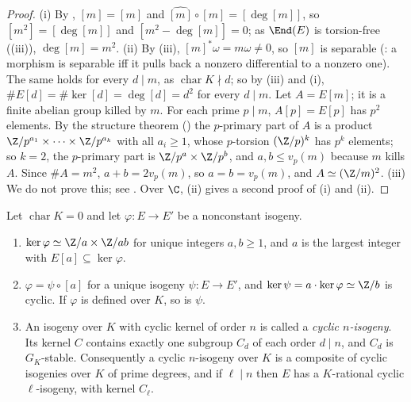 \begin{proof}
(i) By , $\widehat{[m]}=[m]$ and $\widehat{[m]}\circ[m]=[\deg[m]]$, so $[m^2]=[\deg[m]]$ and $[m^2-\deg[m]]=0$; as $\End(E)$ is torsion-free
((iii)), $\deg[m]=m^2$. (ii) By (iii), $[m]^*\omega=m\omega\ne0$, so $[m]$ is separable (:
a morphism is separable iff it pulls back a nonzero differential to a nonzero one). The same holds for every $d\mid m$, as $\operatorname{char}K\nmid d$; so by
(iii) and (i), $\#E[d]=\#\ker[d]=\deg[d]=d^2$ for every $d\mid m$. Let
$A=E[m]$; it is a finite abelian group killed by $m$. For each prime $p\mid m$, $A[p]=E[p]$ has $p^2$ elements. By the structure theorem () the
$p$-primary part of $A$ is a product $\Z/p^{a_1}\times\dots\times\Z/p^{a_k}$ with all $a_i\ge1$, whose $p$-torsion $(\Z/p)^k$ has $p^k$ elements; so $k=2$, the
$p$-primary part is $\Z/p^a\times\Z/p^b$, and $a,b\le v_p(m)$ because $m$ kills $A$. Since $\#A=m^2$, $a+b=2v_p(m)$, so $a=b=v_p(m)$, and
$A\simeq(\Z/m)^2$. (iii) We do not prove this; see \cite[Section III.6]{SilvermanAEC}. Over $\C$, (ii) gives a second proof of (i)
and (ii).
\end{proof}

\begin{proposition}\label{prop:ellcurves:cyclicfactor}
Let $\operatorname{char}K=0$ and let $\varphi\colon E\to E'$ be a nonconstant isogeny.
\begin{enumerate}[label=(\roman*)]
\item $\ker\varphi\simeq\Z/a\times\Z/ab$ for unique integers $a,b\ge1$, and $a$ is the largest integer with $E[a]\subseteq\ker\varphi$.
\item $\varphi=\psi\circ[a]$ for a unique isogeny $\psi\colon E\to E'$, and $\ker\psi=a\cdot\ker\varphi\simeq\Z/b$ is cyclic. If $\varphi$ is defined over $K$, so is $\psi$.
\item An isogeny over $K$ with cyclic kernel of order $n$ is called a \emph{cyclic $n$-isogeny}. Its kernel $C$ contains exactly one subgroup $C_d$ of each order
$d\mid n$, and $C_d$ is $G_K$-stable. Consequently a cyclic $n$-isogeny over $K$ is a composite of cyclic isogenies over $K$ of prime degrees, and if $\ell\mid n$
then $E$ has a $K$-rational cyclic $\ell$-isogeny, with kernel $C_\ell$.
\end{enumerate}
\end{proposition}

